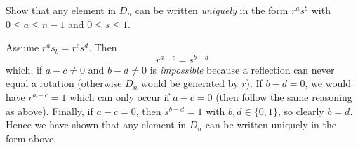 \setcounter{question}{1}
\question
{}

\setcounter{question}{2}
\question Show that any element in $D_n$ can be written \emph{uniquely} in the form
$r^as^b$ with $0 \leq a \leq n - 1$ and $0 \leq s \leq 1$.
\begin{solution}
    Assume $r^as_b=r^cs^d$. 
    Then
    \[
        r^{a - c} = s^{b - d}
    \]
    which, if $a - c \neq 0$ and $b - d \neq 0$ is \emph{impossible}
    because a reflection can never equal a rotation
    (otherwise $D_n$ would be generated by $r$).
    If $b - d = 0$, we would have $r^{a - c} = 1$
    which can only occur if $a - c = 0$ 
    (then follow the same reasoning as above).
    Finally, if $a - c = 0$,
    then $s^{b - d} = 1$
    with $b,d \in \{0,1\}$,
    so clearly $b = d$.
    Hence we have shown that any element in $D_n$ can be written
    uniquely in the form above.
\end{solution}

